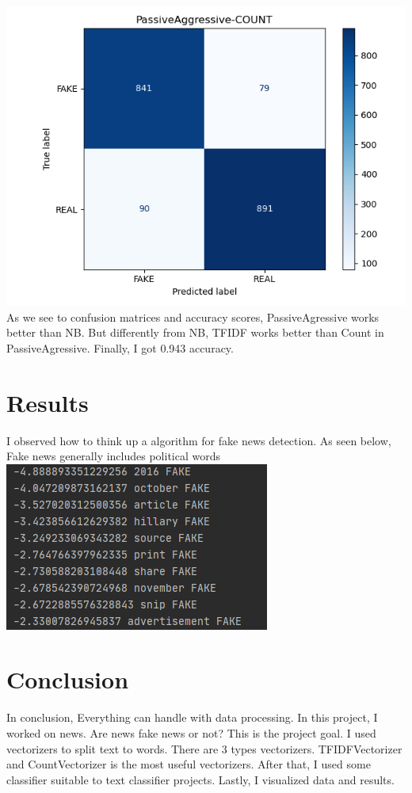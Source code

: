 \documentclass[onecolumn]{article}
\begin{document}
\includegraphics[scale=0.3]{fig/12.PNG}
\bigskip\newline
\noindent
As we see to confusion matrices and accuracy scores, PassiveAgressive works better than NB. But differently from NB, TFIDF works better than Count in PassiveAgressive. Finally, I got 0.943 accuracy.


\section{Results}
I observed how to think up a algorithm for fake news detection. As seen below, Fake news generally includes political words\newline
\includegraphics[scale=0.6]{fig/15.PNG}



\section{Conclusion}
In conclusion, Everything can handle with data processing. In this project, I worked on news. Are news fake news or not? This is the project goal. I used vectorizers to split text to words. There are 3 types vectorizers. TFIDFVectorizer and CountVectorizer is the most useful vectorizers. After that, I used some classifier suitable to text classifier projects. Lastly, I visualized data and results.


\nocite{*}

\end{document}

